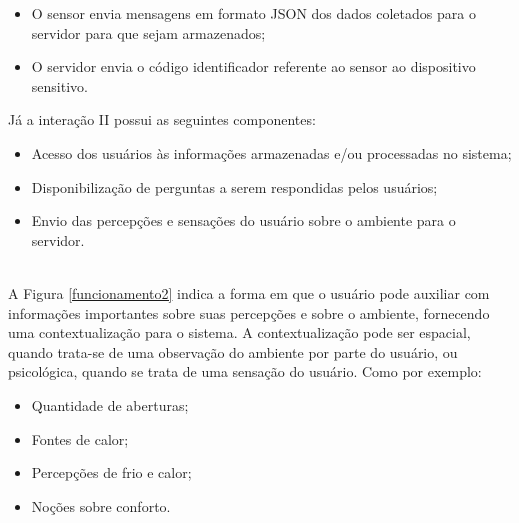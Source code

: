 \begin{itemize}
  \item O sensor envia mensagens em formato JSON dos dados coletados para o servidor para que sejam armazenados;
  \item O servidor envia o código identificador referente ao sensor ao dispositivo sensitivo.
\end{itemize}

\null Já a interação II possui as seguintes componentes:
\begin{itemize}
  \item Acesso dos usuários às informações armazenadas e/ou processadas no sistema;
  \item Disponibilização de perguntas a serem respondidas pelos usuários;
  \item Envio das percepções e sensações do usuário sobre o ambiente para o servidor.
\end{itemize}
\pagebreak
{}

\\\null \quad A Figura \ref{funcionamento2} indica a forma em que o usuário pode auxiliar com informações importantes sobre suas percepções e sobre o ambiente, fornecendo uma contextualização para o sistema. A contextualização pode ser espacial, quando trata-se de uma observação do ambiente por parte do usuário, ou psicológica, quando se trata de uma sensação do usuário. Como por exemplo:
\begin{itemize}
  \item Quantidade de aberturas;
  \item Fontes de calor;
  \item Percepções de frio e calor;
  \item Noções sobre conforto.
\end{itemize}
\pagebreak
{}

